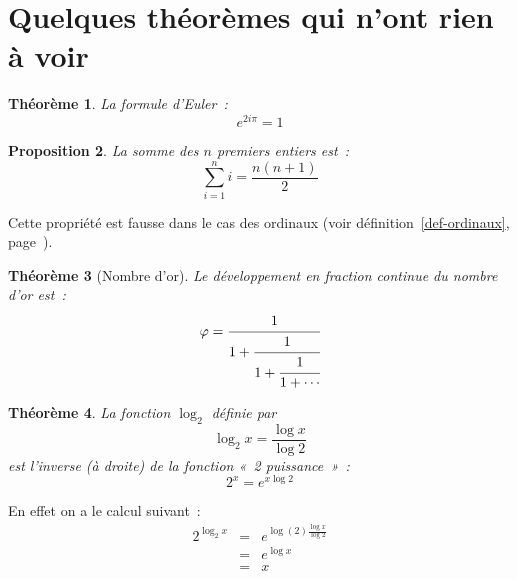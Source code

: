 \documentclass{article}
\newtheorem{theo}{Théorème}[section]    %
\newtheorem{prop}[theo]{Proposition}    %
\newcommand{\expo}[2]{#1^{#2}}
\begin{document}
\section{Quelques théorèmes qui n'ont rien à voir}

\begin{theo}
  La formule d'Euler~:
  \begin{equation}
    \expo e{2i\pi}=1 %
  \end{equation}
\end{theo}

\begin{prop}
  La somme des $n$ premiers entiers est~:
  \begin{displaymath}
    \sum_{i=1}^ni = \frac{n(n+1)}2
  \end{displaymath}
\end{prop}
Cette propriété est fausse dans le cas des ordinaux (voir
définition~\ref{def-ordinaux}, page~\pageref{def-ordinaux}).

\begin{theo}[Nombre d'or]
  Le développement en fraction continue du nombre d'or est~:
  \begin{equation*} %
    \varphi = \cfrac 1{1+\cfrac 1{1 + \cfrac 1{1 + \dotsb}}}
  \end{equation*}
\end{theo}

\begin{theo}\label{theo-log2}
  La fonction $\log_2$ définie par
  \begin{displaymath}
    \log_2 x = \frac{\log x}{\log 2}
  \end{displaymath}
  est l'inverse (à droite) de la fonction «~2 puissance~»~:
  \begin{displaymath}
    2^x = e^{x\log 2}
  \end{displaymath}
\end{theo}

En effet on a le calcul suivant~:
\begin{eqnarray*}
 2^{\log_2 x} &=& e^{\log(2)\frac{\log x}{\log 2}}\\
              &=& e^{\log x}\\
              &=& x
\end{eqnarray*}
\end{document}
